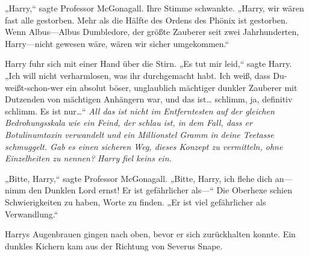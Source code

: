 „Harry,“ sagte Professor McGonagall. Ihre Stimme schwankte. „Harry, wir wären fast alle gestorben. Mehr als die Hälfte des Ordens des Phönix ist gestorben. Wenn Albus—Albus Dumbledore, der größte Zauberer seit zwei Jahrhunderten, Harry—nicht gewesen wäre, wären wir sicher umgekommen.“

Harry fuhr sich mit einer Hand über die Stirn. „Es tut mir leid,“ sagte Harry. „Ich will nicht verharmlosen, was ihr durchgemacht habt. Ich weiß, dass Du-weißt-schon-wer ein absolut böser, unglaublich mächtiger dunkler Zauberer mit Dutzenden von mächtigen Anhängern war, und das ist… schlimm, ja, definitiv schlimm. Es ist nur…“ \emph{All das ist nicht im Entferntesten auf der gleichen Bedrohungsskala wie ein Feind, der schlau ist, in dem Fall, dass er Botulinumtoxin verwandelt und ein Millionstel Gramm in deine Teetasse schmuggelt. Gab es einen sicheren Weg, dieses Konzept zu vermitteln, ohne Einzelheiten zu nennen? Harry fiel keins ein.}

„Bitte, Harry,“ sagte Professor McGonagall. „Bitte, Harry, ich flehe dich an—nimm den Dunklen Lord ernst! Er ist gefährlicher als—“ Die Oberhexe schien Schwierigkeiten zu haben, Worte zu finden. „Er ist viel gefährlicher als Verwandlung.“

Harrys Augenbrauen gingen nach oben, bevor er sich zurückhalten konnte. Ein dunkles Kichern kam aus der Richtung von Severus Snape.

